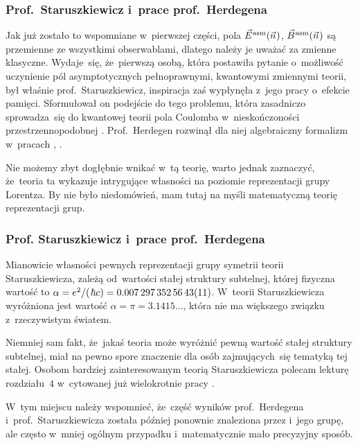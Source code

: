 \documentclass[10pt,t]{beamer}
\begin{document}
\begin{frame}
  \frametitle{Prof.~Staruszkiewicz i~prace prof.~Herdegena}


  Jak już zostało to wspomniane w~pierwszej części, pola $\vec{E}^{ \hspace{0.05em} \text{asm} }( \vec{n} \hspace{0.05em} )$,
  $\vec{B}^{ \hspace{0.05em} \text{asm} }( \vec{n} \hspace{0.05em} )$ są przemienne ze wszystkimi obserwablami, dlatego należy
  je uważać za zmienne klasyczne. Wydaje~się, że~pierwszą osobą, która
  postawiła pytanie o~możliwość uczynienie pól asymptotycznych
  pełnoprawnymi, kwantowymi zmiennymi teorii, był właśnie
  prof.~Staruszkiewicz, inspiracja zaś wypłynęła z~jego pracy o~efekcie
  pamięci. Sformułował on podejście do tego problemu, która zasadniczo
  sprowadza~się do kwantowej teorii pola Coulomba w~nieskończoności
  przestrzennopodobnej
  \parencite{Staruszkiewicz-Quantum-Mechanics-of-Phase-and-Charge-ETC-Pub-1989}.
  Prof.~Herdegen rozwinął dla niej algebraiczny formalizm w~pracach
  \parencite{Herdegen-Asymptotic-algebra-of-quantum-electrodynamics-Pub-2005},
  \parencite{Herdegen-Remarks-on-mathematical-structure-of-ETC-Pub-2022}.

  Nie możemy zbyt dogłębnie wnikać w~tą teorię, warto jednak zaznaczyć,
  że~teoria ta wykazuje intrygujące własności na poziomie reprezentacji
  grupy Lorentza. By nie było niedomówień, mam tutaj na myśli matematyczną
  teorię reprezentacji grup.

\end{frame}





\begin{frame}
  \frametitle{Prof. Staruszkiewicz i~prace prof.~Herdegena}


  Mianowicie własności pewnych reprezentacji grupy symetrii teorii
  Staruszkiewicza, zależą od~wartości stałej struktury subtelnej, której
  fizyczna wartość to
  $\alpha = e^{ 2 } / ( \hspace{0.09em} \hbar c ) = 0.007 \, 297 \, 352 \, 56 \,
  43(11)$. W~teorii Staruszkiewicza
  wyróżniona jest wartość $\alpha = \pi = 3.1415\ldots$, która nie ma większego związku
  z~rzeczywistym światem.

  Niemniej sam fakt, że~jakaś teoria może wyróżnić
  pewną wartość stałej struktury subtelnej, miał na pewno spore
  znaczenie dla osób zajmujących~się tematyką tej stałej.
  Osobom bardziej zainteresowanym teorią Staruszkiewicza polecam lekturę
  rozdziału~$4$ w~cytowanej już wielokrotnie pracy
  \parencite{Herdegen-Infrared-structure-beyond-locality-ETC-Ver-2024}.

  W~tym miejscu należy wspomnieć, że~część wyników prof.~Herdegena
  i~prof.~Staruszkiewicza została później ponownie znaleziona przez
   i~jego grupę, ale często w~mniej ogólnym przypadku
  i~matematycznie mało precyzyjny sposób.

\end{frame}
\end{document}
